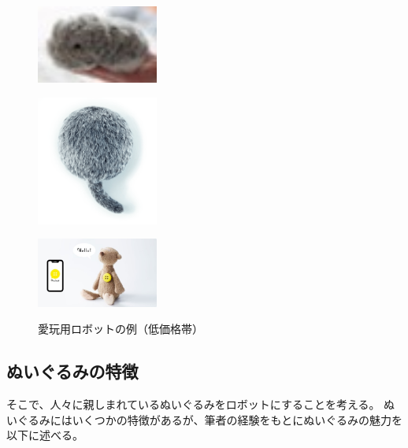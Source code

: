 \documentclass[uplatex,a4paper,12pt]{jsarticle}
\begin{document}
\begin{figure}[htbp]
  \centering
  \begin{minipage}[c]{0.32\linewidth}
    \centering
    \includegraphics[keepaspectratio,width=4cm,clip]{images/previous_robots/moflin.jpg}
    \label{fig:moflin}
  \end{minipage}
  \begin{minipage}[c]{0.32\linewidth}
    \centering
    \includegraphics[keepaspectratio,width=4cm,clip]{images/previous_robots/qoobo.png}
    \label{fig:qoobo}
  \end{minipage}
  \begin{minipage}[c]{0.32\linewidth}
    \centering
    \includegraphics[keepaspectratio,width=4cm,clip]{images/previous_robots/pechat.jpg}
    \label{fig:pechat}
  \end{minipage}
  \caption{愛玩用ロボットの例（低価格帯）}
  \label{fig:previous_robots_inexpensive}
\end{figure}


\subsection{ぬいぐるみの特徴}

そこで、人々に親しまれているぬいぐるみをロボットにすることを考える。
ぬいぐるみにはいくつかの特徴があるが、筆者の経験をもとにぬいぐるみの魅力を以下に述べる。
\end{document}
